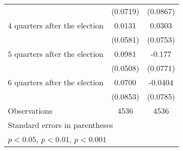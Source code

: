 \begin{table}[htbp]
\begin{tabular}{l*{2}{c}}
                    &    (0.0719)         &    (0.0867)         \\
[1em]
 4 quarters after the election&      0.0131         &      0.0303         \\
                    &    (0.0581)         &    (0.0753)         \\
[1em]
 5 quarters after the election&      0.0981         &      -0.177\sym{*}  \\
                    &    (0.0508)         &    (0.0771)         \\
[1em]
 6 quarters after the election&      0.0700         &     -0.0404         \\
                    &    (0.0853)         &    (0.0785)         \\
\hline
Observations        &        4536         &        4536         \\
\hline\hline
\multicolumn{3}{l}{\footnotesize Standard errors in parentheses}\\
\multicolumn{3}{l}{\footnotesize \sym{*} \(p<0.05\), \sym{**} \(p<0.01\), \sym{***} \(p<0.001\)}\\
\end{tabular}
\end{table}
